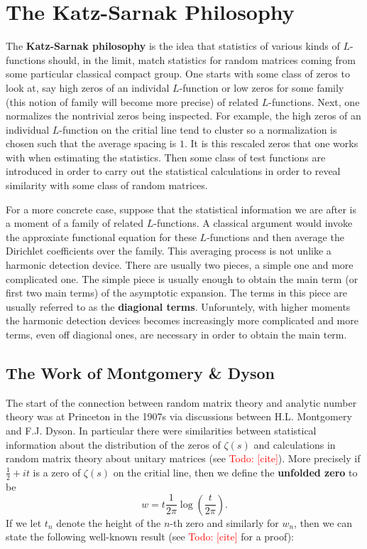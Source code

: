 \documentclass[12pt]{book}
\theoremstyle{definition}\newframedtheorem{method}{Method}
\newcommand{\z}{\zeta}
\newcommand{\<}{\langle}
\renewcommand{\>}{\rangle}
\newcommand{\todo}[1]{\textcolor{red}{\sf Todo: [#1]}}
\begin{document}
  \section{The Katz-Sarnak Philosophy}
    The \textbf{Katz-Sarnak philosophy} is the idea that statistics of various kinds of $L$-functions should, in the limit, match statistics for random matrices coming from some particular classical compact group. One starts with some class of zeros to look at, say high zeros of an individal $L$-function or low zeros for some family (this notion of family will become more precise) of related $L$-functions. Next, one normalizes the nontrivial zeros being inspected. For example, the high zeros of an individual $L$-function on the critial line tend to cluster so a normalization is chosen such that the average spacing is $1$. It is this rescaled zeros that one works with when estimating the statistics. Then some class of test functions are introduced in order to carry out the statistical calculations in order to reveal similarity with some class of random matrices.

    For a more concrete case, suppose that the statistical information we are after is a moment of a family of related $L$-functions. A classical argument would invoke the approxiate functional equation for these $L$-functions and then average the Dirichlet coefficients over the family. This averaging process is not unlike a harmonic detection device. There are usually two pieces, a simple one and more complicated one. The simple piece is usually enough to obtain the main term (or first two main terms) of the asymptotic expansion. The terms in this piece are usually referred to as the \textbf{diagional terms}. Unforuntely, with higher moments the harmonic detection devices becomes increasingly more complicated and more terms, even off diagional ones, are necessary in order to obtain the main term.
    \subsection*{The Work of Montgomery \& Dyson}
      The start of the connection between random matrix theory and analytic number theory was at Princeton in the 1907s via discussions between H.L. Montgomery and F.J. Dyson. In particular there were similarities between statistical information about the distribution of the zeros of $\z(s)$ and calculations in random matrix theory about unitary matrices (see \todo{cite}). More precisely if $\frac{1}{2}+it$ is a zero of $\z(s)$ on the critial line, then we define the \textbf{unfolded zero} to be
      \[
        w = t\frac{1}{2\pi}\log\left(\frac{t}{2\pi}\right).
      \]
      If we let $t_{n}$ denote the height of the $n$-th zero and similarly for $w_{n}$, then we can state the following well-known result (see \todo{cite} for a proof):
\end{document}
